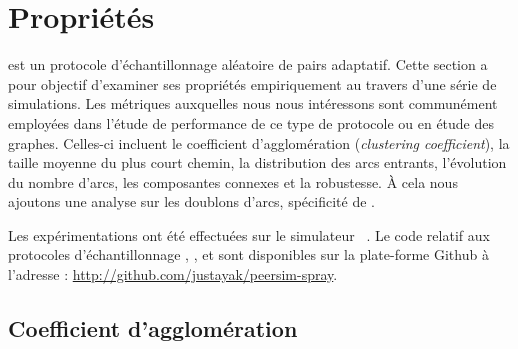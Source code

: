 
\section{Propriétés}
\label{net:sec:properties}

\SPRAY est un protocole d'échantillonnage aléatoire de pairs adaptatif. Cette
section a pour objectif d'examiner ses propriétés empiriquement au travers d'une
série de simulations. Les métriques auxquelles nous nous intéressons sont
communément employées dans l'étude de performance de ce type de protocole ou en
étude des graphes. Celles-ci incluent le coefficient d'agglomération
(\emph{clustering coefficient}), la taille moyenne du plus court chemin, la
distribution des arcs entrants, l'évolution du nombre d'arcs, les composantes
connexes et la robustesse. À cela nous ajoutons une analyse sur les doublons
d'arcs, spécificité de \SPRAY.


Les expérimentations ont été effectuées sur le simulateur
\PEERSIM~\cite{montresor2009peersim}. Le code relatif aux protocoles
d'échantillonnage \CYCLON, \SCAMP, et \SPRAY sont disponibles sur la
plate-forme Github à l'adresse : \url{http://github.com/justayak/peersim-spray}.

\subsection{Coefficient d'agglomération}
\label{net:subsec:clustering}

